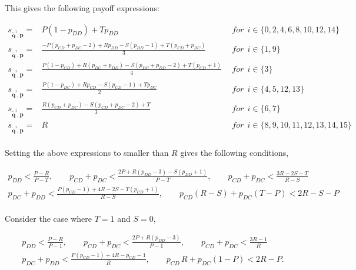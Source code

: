 \documentclass{article}
\theoremstyle{definition}
\begin{document}
This gives the following payoff expressions:

\begin{equation*}
  \begin{array}{lcl}
  s_{\mathbf{\tilde{q}}^{i}, \mathbf{p}} = & P (1 - p_{DD}) + T p_{DD} & ~~for~~ i \in \{0, 2, 4, 6, 8, 10, 12, 14\} \\ [0.3cm]
  s_{\mathbf{\tilde{q}}^{i}, \mathbf{p}} = & \frac{-P(p_{CD} + p_{DC} - 2) + Rp_{DD} - S(p_{DD} - 1) + T(p_{CD} + p_{DC})}{3} & ~~for~~ i \in \{1, 9\} \\ [0.3cm]
  s_{\mathbf{\tilde{q}}^{i}, \mathbf{p}} = & \frac{P(1 - p_{CD}) + R(p_{DC} + p_{DD}) - S(p_{DC} + p_{DD} - 2) + T(p_{CD} + 1)}{4} & ~~for~~ i \in \{3\} \\ [0.3cm]
  s_{\mathbf{\tilde{q}}^{i}, \mathbf{p}} = & \frac{P(1 - p_{DC}) + Rp_{CD} - S(p_{CD} - 1) + Tp_{DC}}{2} & ~~for~~ i \in \{4, 5, 12, 13\} \\ [0.3cm]
  s_{\mathbf{\tilde{q}}^{i}, \mathbf{p}} = & \frac{R(p_{CD} + p_{DC}) - S(p_{CD} + p_{DC} - 2) + T}{3} & ~~for~~ i \in \{6, 7\} \\ [0.3cm]
  s_{\mathbf{\tilde{q}}^{i}, \mathbf{p}} = & R & ~~for~~ i \in \{8, 9, 10, 11, 12, 13, 14, 15\} \\ [0.3cm]
\end{array}
\end{equation*}

Setting the above expressions to smaller than $R$ gives the following conditions,

\normalsize{
\begin{equation*}
  \begin{array}{c}
  p_{DD} < \frac{P - R}{P - T}, 
  \qquad p_{CD} + p_{DC} < \frac{2 P + R (p_{DD} - 3) - S (p_{DD} + 1)}{P - T},
  \qquad p_{CD} + p_{DC} < \frac{3 R - 2 S - T}{R - S} \\ [0.4cm]
  p_{DC} + p_{DD} < \frac{P \left(p_{CD} - 1\right) + 4 R - 2 S - T \left(p_{CD} + 1\right)}{R - S},
  \qquad p_{CD} \left(R - S\right) + p_{DC} \left(T - P\right) < 2 R - S - P \\
\end{array}
\end{equation*}}

Consider the case where $T=1$ and $S=0$,

\begin{equation*}
  \begin{array}{c}
  p_{DD} < \frac{P - R}{P - 1},
  \qquad p_{CD} + p_{DC} < \frac{2 P + R (p_{DD} - 3)}{P - 1},
  \qquad p_{CD} + p_{DC} < \frac{3 R - 1}{R} \\ [0.4cm]
  p_{DC} + p_{DD} < \frac{P \left(p_{CD} - 1\right) + 4 R - p_{CD} - 1}{R},
  \qquad p_{CD} \, R + p_{DC} \left(1 - P\right) < 2 R  - P.
\end{array}
\end{equation*}
\end{document}
